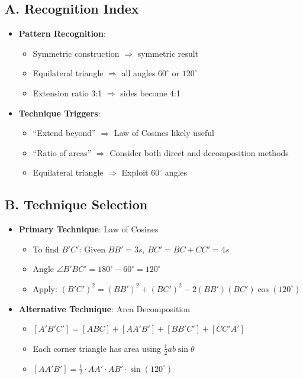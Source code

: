 \documentclass[11pt]{article}
\begin{document}
\begin{techniquesbox}
\subsection*{A. Recognition Index}
\begin{itemize}[leftmargin=*]
    \item \textbf{Pattern Recognition}: 
    \begin{itemize}
        \item Symmetric construction $\Rightarrow$ symmetric result
        \item Equilateral triangle $\Rightarrow$ all angles $60^{\circ}$ or $120^{\circ}$
        \item Extension ratio 3:1 $\Rightarrow$ sides become 4:1
    \end{itemize}
    \item \textbf{Technique Triggers}:
    \begin{itemize}
        \item ``Extend beyond'' $\Rightarrow$ Law of Cosines likely useful
        \item ``Ratio of areas'' $\Rightarrow$ Consider both direct and decomposition methods
        \item Equilateral triangle $\Rightarrow$ Exploit $60^{\circ}$ angles
    \end{itemize}
\end{itemize}

\subsection*{B. Technique Selection}
\begin{itemize}[leftmargin=*]
    \item \textbf{Primary Technique}: Law of Cosines
    \begin{itemize}
        \item To find $B'C'$: Given $BB' = 3s$, $BC' = BC + CC' = 4s$
        \item Angle $\angle B'BC' = 180^{\circ} - 60^{\circ} = 120^{\circ}$
        \item Apply: $(B'C')^2 = (BB')^2 + (BC')^2 - 2(BB')(BC')\cos(120^{\circ})$
    \end{itemize}
    \item \textbf{Alternative Technique}: Area Decomposition
    \begin{itemize}
        \item $[A'B'C'] = [ABC] + [AA'B'] + [BB'C'] + [CC'A']$
        \item Each corner triangle has area using $\frac{1}{2}ab\sin\theta$
        \item $[AA'B'] = \frac{1}{2} \cdot AA' \cdot AB' \cdot \sin(120^{\circ})$
    \end{itemize}
\end{itemize}


\end{techniquesbox}
\end{document}
